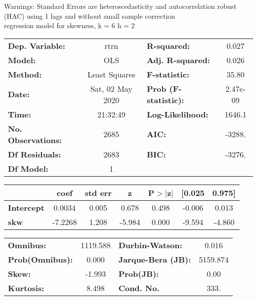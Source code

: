 Warnings: \newline
 [1] Standard Errors are heteroscedasticity and autocorrelation robust (HAC) using 1 lags and without small sample correction\\ 

regression model for skewness, k = 6 h = 2\begin{center}
\begin{tabular}{lclc}
\toprule
\textbf{Dep. Variable:}    &       rtrn       & \textbf{  R-squared:         } &     0.027   \\
\textbf{Model:}            &       OLS        & \textbf{  Adj. R-squared:    } &     0.026   \\
\textbf{Method:}           &  Least Squares   & \textbf{  F-statistic:       } &     35.80   \\
\textbf{Date:}             & Sat, 02 May 2020 & \textbf{  Prob (F-statistic):} &  2.47e-09   \\
\textbf{Time:}             &     21:32:49     & \textbf{  Log-Likelihood:    } &    1646.1   \\
\textbf{No. Observations:} &        2685      & \textbf{  AIC:               } &    -3288.   \\
\textbf{Df Residuals:}     &        2683      & \textbf{  BIC:               } &    -3276.   \\
\textbf{Df Model:}         &           1      & \textbf{                     } &             \\
\bottomrule
\end{tabular}
\begin{tabular}{lcccccc}
                   & \textbf{coef} & \textbf{std err} & \textbf{z} & \textbf{P$> |$z$|$} & \textbf{[0.025} & \textbf{0.975]}  \\
\midrule
\textbf{Intercept} &       0.0034  &        0.005     &     0.678  &         0.498        &       -0.006    &        0.013     \\
\textbf{skw}       &      -7.2268  &        1.208     &    -5.984  &         0.000        &       -9.594    &       -4.860     \\
\bottomrule
\end{tabular}
\begin{tabular}{lclc}
\textbf{Omnibus:}       & 1119.588 & \textbf{  Durbin-Watson:     } &    0.016  \\
\textbf{Prob(Omnibus):} &   0.000  & \textbf{  Jarque-Bera (JB):  } & 5159.874  \\
\textbf{Skew:}          &  -1.993  & \textbf{  Prob(JB):          } &     0.00  \\
\textbf{Kurtosis:}      &   8.498  & \textbf{  Cond. No.          } &     333.  \\
\bottomrule
\end{tabular}
\end{center}

